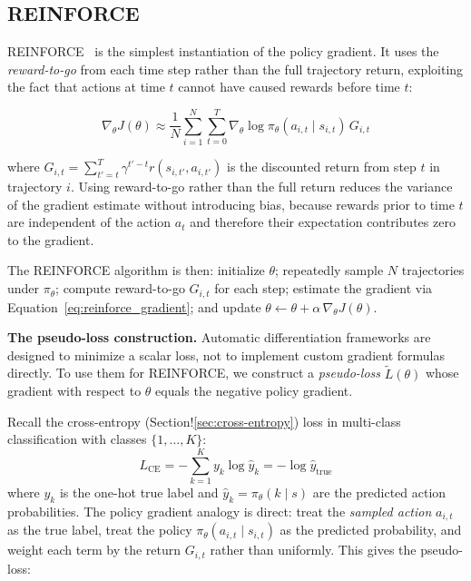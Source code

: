 \documentclass{book}
\begin{document}
\subsection{REINFORCE}
\label{sec:reinforce}

REINFORCE~\cite{williams1992simple} is the simplest instantiation of the
policy gradient. It uses the \emph{reward-to-go} from each time step rather
than the full trajectory return, exploiting the fact that actions at time
$t$ cannot have caused rewards before time $t$:

\begin{equation}
\label{eq:reinforce_gradient}
\nabla_\theta J(\theta) \approx \frac{1}{N} \sum_{i=1}^{N} \sum_{t=0}^{T}
    \nabla_\theta \log \pi_\theta(a_{i,t} \mid s_{i,t})\, G_{i,t}
\end{equation}

where $G_{i,t} = \sum_{t'=t}^{T} \gamma^{t'-t} r(s_{i,t'}, a_{i,t'})$
is the discounted return from step $t$ in trajectory $i$. Using
reward-to-go rather than the full return reduces the variance of the
gradient estimate without introducing bias, because rewards prior to time
$t$ are independent of the action $a_t$ and therefore their expectation
contributes zero to the gradient.

The REINFORCE algorithm is then: initialize $\theta$; repeatedly sample
$N$ trajectories under $\pi_\theta$; compute reward-to-go $G_{i,t}$ for
each step; estimate the gradient via Equation~\ref{eq:reinforce_gradient};
and update $\theta \leftarrow \theta + \alpha\, \nabla_\theta J(\theta)$.

\textbf{The pseudo-loss construction.} Automatic differentiation frameworks
are designed to minimize a scalar loss, not to implement custom gradient
formulas directly. To use them for REINFORCE, we construct a
\emph{pseudo-loss} $\tilde{L}(\theta)$ whose gradient with respect to
$\theta$ equals the negative policy gradient.

Recall the cross-entropy (Section!\ref{sec:cross-entropy}) loss in multi-class classification with classes
$\{1, \ldots, K\}$:
\begin{equation}
\label{eq:cross_entropy}
L_{\text{CE}} = -\sum_{k=1}^{K} y_k \log \hat{y}_k = -\log \hat{y}_{\text{true}}
\end{equation}
where $y_k$ is the one-hot true label and $\hat{y}_k = \pi_\theta(k \mid s)$
are the predicted action probabilities. The policy gradient analogy is
direct: treat the \emph{sampled action} $a_{i,t}$ as the true label, treat
the policy $\pi_\theta(a_{i,t} \mid s_{i,t})$ as the predicted probability,
and weight each term by the return $G_{i,t}$ rather than uniformly. This
gives the pseudo-loss:
\end{document}
